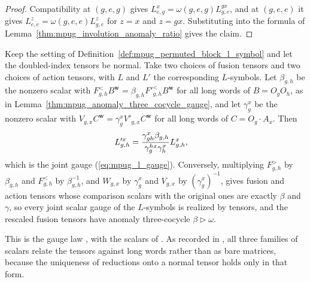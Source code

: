 \begin{proof}\leanok
    Compatibility at $(g,e,g)$ gives $L^x_{e,g}=\omega(g,e,g)L^{gx}_{g,e}$,
    and at $(g,e,e)$ it gives $L^z_{e,e}=\omega(g,e,e)L^z_{g,e}$ for $z=x$ and
    $z=gx$. Substituting into the formula of
    Lemma~\ref{thm:mpug_involution_anomaly_ratio} gives the claim.
\end{proof}

\begin{lemma}
    \label{lem:mpug_permuted_block_l_gauge}
    \leanok
    Keep the setting of Definition~\ref{def:mpug_permuted_block_l_symbol}
    and let the doubled-index tensors be normal. Take two choices of fusion
    tensors and two choices of action tensors, with $L$ and $L'$ the
    corresponding $L$-symbols. Let $\beta_{g,h}$ be the nonzero scalar with
    $F^<_{g,h}B^{\mathbf w}=\beta_{g,h}F'^<_{g,h}B^{\mathbf w}$ for all long
    words of $B=O_gO_h$, as in
    Lemma~\ref{thm:mpug_anomaly_three_cocycle_gauge}, and let $\gamma^x_g$ be
    the nonzero scalar with
    $V_{g,x}C^{\mathbf w}=\gamma^x_gV'_{g,x}C^{\mathbf w}$ for all long words
    of $C=O_g\cdot A_x$. Then
    \begin{align}
        L'^x_{g,h}
         & =\frac{\gamma^x_{gh}\beta_{g,h}}{\gamma^{hx}_g\gamma^x_h}L^x_{g,h},
        \notag
    \end{align}
    which is the joint gauge (\ref{eq:mpug_l_gauge}). Conversely,
    multiplying $F^>_{g,h}$ by $\beta_{g,h}$ and $F^<_{g,h}$ by
    $\beta_{g,h}^{-1}$, and $W_{g,x}$ by $\gamma^x_g$ and $V_{g,x}$ by
    $(\gamma^x_g)^{-1}$, gives fusion and action tensors whose comparison
    scalars with the original ones are exactly $\beta$ and $\gamma$, so every
    joint scalar gauge of the $L$-symbols is realized by tensors, and the
    rescaled fusion tensors have anomaly three-cocycle
    $\beta\mathbin{\triangleright}\omega$.

    This is the gauge law \cite[line~1918]{FrancoRubio2025MPUGauging}, with
    the scalars of
    \cite[lines~1500--1504, 1871--1873]{FrancoRubio2025MPUGauging}.
    As recorded in
    \cite{gap:fbc25_boundary_dressed_l_symbols}, all three families of scalars
    relate the tensors against long words rather than as bare matrices,
    because the uniqueness of reductions onto a normal tensor holds only in
    that form.
\end{lemma}

